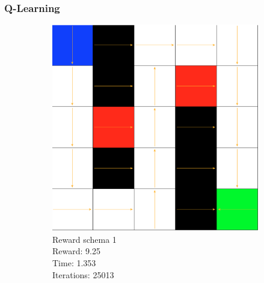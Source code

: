 \documentclass[a4paper,10pt]{article}
\begin{document}
\subsubsection{Q-Learning}
\begin{figure}[H]
        \centering
        \begin{subfigure}[b]{0.3\textwidth}
                \includegraphics[width=\textwidth]{figures/5x5_qlearn_r1.png}
                \caption{Reward schema 1\\ 
                Reward:  9.25 \\
                Time:  1.353 \\
                Iterations:  25013 }
                \label{fig:q1}
        \end{subfigure}%
        ~ %
        \begin{subfigure}[b]{0.3\textwidth}

\end{subfigure}
\end{figure}
\end{document}
